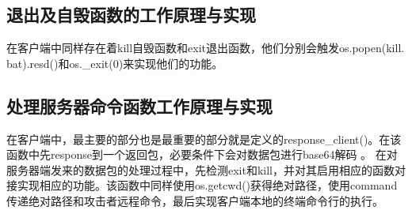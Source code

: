\subsection{退出及自毁函数的工作原理与实现}
在客户端中同样存在着kill自毁函数和exit退出函数，他们分别会触发os.popen(kill.\\bat).resd()和os.\_exit(0)来实现他们的功能。
\subsection{处理服务器命令函数工作原理与实现}
在客户端中，最主要的部分也是最重要的部分就是定义的response\_client()。在该函数中先response到一个返回包，必要条件下会对数据包进行base64解码\cite{10} 。
在对服务器端发来的数据包的处理过程中，先检测exit和kill，并对其启用相应的函数对接实现相应的功能。该函数中同样使用os.getcwd()获得绝对路径，使用command传递绝对路径和攻击者远程命令，最后实现客户端本地的终端命令行的执行。




